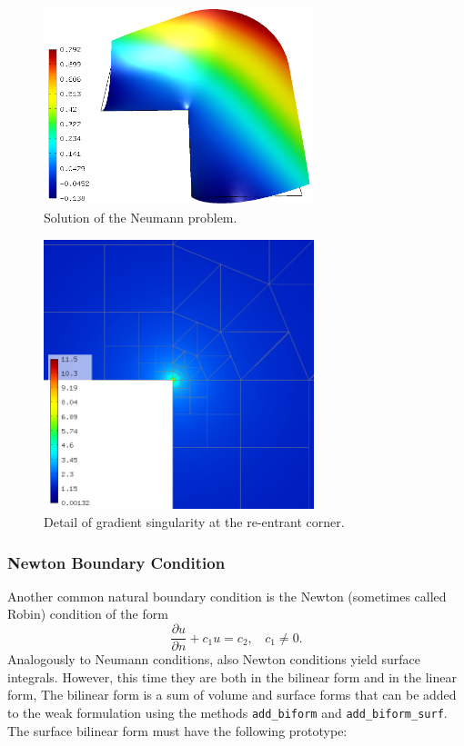 \documentclass[11pt]{article}
\newcommand{\dd}[2]{\frac{\partial #1}{\partial #2}}
\begin{document}
\begin{figure}[!ht]
  \centering\medskip
  \includegraphics[width=0.7\textwidth]{img/neumann2.png}
  \caption{Solution of the Neumann problem.}
  \label{fig:neumann2}
\end{figure}

\begin{figure}[!ht]
  \centering\medskip
  \includegraphics[width=0.7\textwidth]{img/neumann3.png}
  \caption{Detail of gradient singularity at the re-entrant corner.}
  \label{fig:neumann3}
\end{figure}




\subsubsection{Newton Boundary Condition}

Another common natural boundary condition is the Newton (sometimes called Robin) condition
of the form
$$\dd{u}{n} + c_1 u = c_2, \ \ \ \ c_1 \ne 0.$$
Analogously to Neumann conditions, also Newton conditions yield surface integrals. However,
this time they are both in the bilinear form and in the linear form,
The bilinear form is
a sum of volume and surface forms that can be added to the weak formulation using the methods
{\tt add\_biform} and {\tt add\_biform\_surf}. %
The surface bilinear form must have the following prototype:
\end{document}
